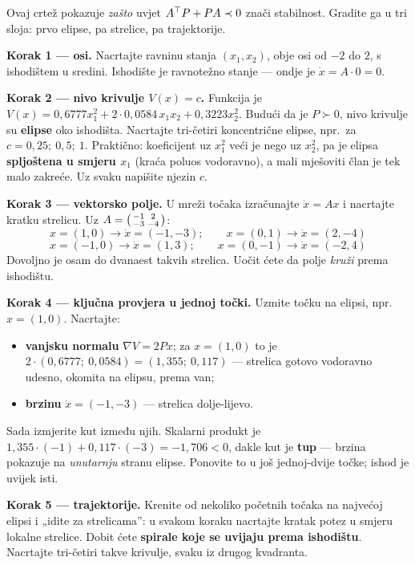 \begin{crtanje}
Ovaj crtež pokazuje \emph{zašto} uvjet $A^{\top} P + PA \prec 0$ znači stabilnost.
Gradite ga u tri sloja: prvo elipse, pa strelice, pa trajektorije.

\textbf{Korak 1 --- osi.} Nacrtajte ravninu stanja $(x_1, x_2)$, obje osi od
$-2$ do $2$, s ishodištem u sredini. Ishodište je ravnotežno stanje --- ondje
je $\dot x = A\cdot 0 = 0$.

\textbf{Korak 2 --- nivo krivulje $V(x) = c$.} Funkcija je
$V(x) = 0{,}6777x_1^2 + 2\cdot0{,}0584\,x_1x_2 + 0{,}3223x_2^2$. Budući da je
$P \succ 0$, nivo krivulje su \textbf{elipse} oko ishodišta. Nacrtajte tri-četiri
koncentrične elipse, npr.\ za $c = 0{,}25;\ 0{,}5;\ 1$. Praktično: koeficijent uz
$x_1^2$ veći je nego uz $x_2^2$, pa je elipsa \textbf{spljoštena u smjeru $x_1$}
(kraća poluos vodoravno), a mali mješoviti član je tek malo zakreće. Uz svaku
napišite njezin $c$.

\textbf{Korak 3 --- vektorsko polje.} U mreži točaka izračunajte
$\dot x = Ax$ i nacrtajte kratku strelicu. Uz
$A = \begin{psmallmatrix}-1 & 2\\ -3 & -4\end{psmallmatrix}$:
\[
x = (1,0) \to \dot x = (-1,-3); \qquad
x = (0,1) \to \dot x = (2,-4)
\]
\[
x = (-1,0) \to \dot x = (1,3); \qquad
x = (0,-1) \to \dot x = (-2,4)
\]
Dovoljno je osam do dvanaest takvih strelica. Uočit ćete da polje \emph{kruži}
prema ishodištu.

\textbf{Korak 4 --- ključna provjera u jednoj točki.} Uzmite točku na elipsi,
npr.\ $x = (1,0)$. Nacrtajte:
\begin{itemize}
  \item \textbf{vanjsku normalu} $\nabla V = 2Px$; za $x=(1,0)$ to je
        $2\cdot(0{,}6777;\ 0{,}0584) = (1{,}355;\ 0{,}117)$ --- strelica gotovo
        vodoravno udesno, okomita na elipsu, prema van;
  \item \textbf{brzinu} $\dot x = (-1,-3)$ --- strelica dolje-lijevo.
\end{itemize}
Sada izmjerite kut između njih. Skalarni produkt je
$1{,}355\cdot(-1) + 0{,}117\cdot(-3) = -1{,}706 < 0$, dakle kut je
\textbf{tup} --- brzina pokazuje na \emph{unutarnju} stranu elipse. Ponovite to
u još jednoj-dvije točke; ishod je uvijek isti.

\textbf{Korak 5 --- trajektorije.} Krenite od nekoliko početnih točaka na
najvećoj elipsi i „idite za strelicama”: u svakom koraku nacrtajte kratak potez
u smjeru lokalne strelice. Dobit ćete \textbf{spirale koje se uvijaju prema
ishodištu}. Nacrtajte tri-četiri takve krivulje, svaku iz drugog kvadranta.


\end{crtanje}

